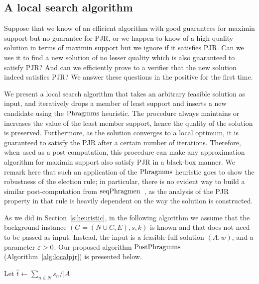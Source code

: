 \subsection{A local search algorithm}\label{s:LS}

Suppose that we know of an efficient algorithm with good guarantees for maximin support but no guarantee for PJR, or we happen to know of a high quality solution in terms of maximin support but we ignore if it satisfies PJR. Can we use it to find a new solution of no lesser quality which is also guaranteed to satisfy PJR? And can we efficiently prove to a verifier that the new solution indeed satisfies PJR? We answer these questions in the positive for the first time.

We present a local search algorithm that takes an arbitrary feasible solution as input, and iteratively drops a member of least support and inserts a new candidate using the $\operatorname{Phragmms}$ heuristic. The procedure always maintains or increases the value of the least member support, hence the quality of the solution is preserved. Furthermore, as the solution converges to a local optimum, it is guaranteed to satisfy the PJR after a certain number of iterations. 
Therefore, when used as a post-computation, this procedure can make any approximation algorithm for maximin support also satisfy PJR in a black-box manner. 
We remark here that such an application of the $\operatorname{Phragmms}$ heuristic goes to show the robustness of the election rule; in particular, there is no evident way to build a similar post-computation from $\operatorname{seqPhragmen}$~\cite{brill2017phragmen}, as the analysis of the PJR property in that rule is heavily dependent on the way the solution is constructed. 

As we did in Section~\ref{s:heuristic}, in the following algorithm we assume that the background instance $(G=(N\cup C, E), s, k)$ is known and that does not need to be passed as input. 
Instead, the input is a feasible full solution $(A,w)$, and a parameter $\varepsilon>0$. 
Our proposed algorithm $\operatorname{PostPhragmms}$ (Algorithm~\ref{alg:localpjr}) is presented below. 

\begin{algorithm}[htb]\label{alg:localpjr}
\SetAlgoLined
{}

Let $\hat{t}\leftarrow \sum_{n\in N} s_n / |A|$\;
\caption{$\LSPJR(A,w,\eps)$}
\end{algorithm}

